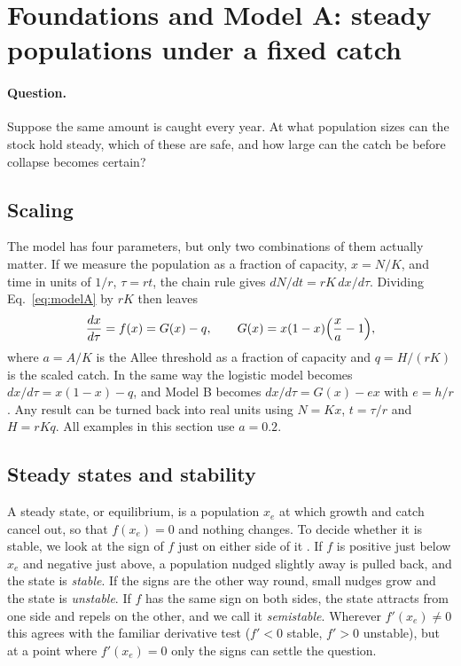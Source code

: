 \section{Foundations and Model A: steady populations under a fixed catch}
\label{sec:foundations}

\paragraph{Question.} Suppose the same amount is caught every year. At what population sizes can the stock hold steady, which of these are safe, and how large can the catch be before collapse becomes certain?

\subsection{Scaling}
\label{sec:scaling}
The model has four parameters, but only two combinations of them actually matter. If we measure the population as a fraction of capacity, $x=N/K$, and time in units of $1/r$, $\tau=rt$, the chain rule gives $dN/dt=rK\,dx/d\tau$. Dividing Eq.~\eqref{eq:modelA} by $rK$ then leaves
\begin{equation}
\frac{dx}{d\tau}=f(x)=G(x)-q,\qquad G(x)=x(1-x)\Bigl(\frac{x}{a}-1\Bigr),
\label{eq:A_dimless}
\end{equation}
where $a=A/K$ is the Allee threshold as a fraction of capacity and $q=H/(rK)$ is the scaled catch. In the same way the logistic model becomes $dx/d\tau=x(1-x)-q$, and Model B becomes $dx/d\tau=G(x)-ex$ with $e=h/r$. Any result can be turned back into real units using $N=Kx$, $t=\tau/r$ and $H=rKq$. All examples in this section use $a=0.2$.

\subsection{Steady states and stability}
A steady state, or equilibrium, is a population $x_e$ at which growth and catch cancel out, so that $f(x_e)=0$ and nothing changes. To decide whether it is stable, we look at the sign of $f$ just on either side of it \cite{strogatz2015nonlinear}. If $f$ is positive just below $x_e$ and negative just above, a population nudged slightly away is pulled back, and the state is \emph{stable}. If the signs are the other way round, small nudges grow and the state is \emph{unstable}. If $f$ has the same sign on both sides, the state attracts from one side and repels on the other, and we call it \emph{semistable}. Wherever $f'(x_e)\neq0$ this agrees with the familiar derivative test ($f'<0$ stable, $f'>0$ unstable), but at a point where $f'(x_e)=0$ only the signs can settle the question.

